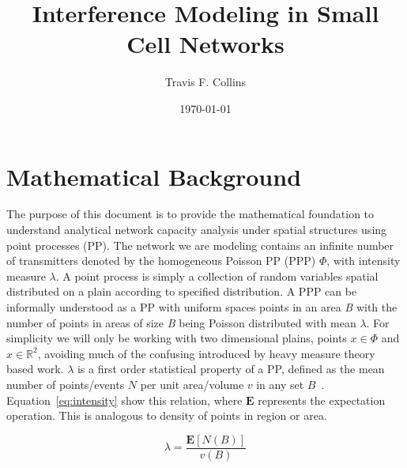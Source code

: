 \documentclass[a4paper]{article}
\title{Interference Modeling in Small Cell Networks}
\author{Travis F. Collins}
\date{\today}
\begin{document}
\maketitle

\section{Mathematical Background}
The purpose of this document is to provide the mathematical foundation to understand analytical network capacity analysis under spatial structures using point processes (PP).
The network we are modeling contains an infinite number of transmitters denoted by the homogeneous Poisson PP (PPP) $\Phi$, with intensity measure $\lambda$.  A point process is simply a collection of random variables spatial distributed on a plain according to specified distribution.  A PPP can be informally understood as a PP with uniform spaces points in an area \textit{B} with the number of points in areas of size \textit{B} being Poisson distributed with mean $\lambda$. For simplicity we will only be working with two dimensional plains, points $x\in\Phi$ and $x\in\mathbb{R}^2$, avoiding much of the confusing introduced by heavy measure theory based work.  $\lambda$ is a first order statistical property of a PP, defined as the mean number of points/events  $\textit{N}$ per unit area/volume $\textit{v}$ in any set $\textit{B}$~\cite{Illian2008}.  Equation~\eqref{eq:intensity} show this relation, where $\textbf{E}$ represents the expectation operation.  This is analogous to density of points in region or area.\par
%
\begin{equation}\label{eq:intensity}
\lambda = \frac{\textbf{E}[N(B)]}{v(B)}
\end{equation}
%
\end{document}
